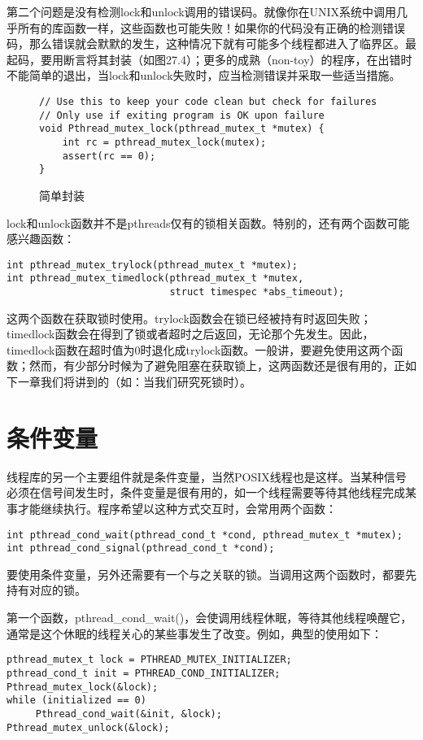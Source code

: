 第二个问题是没有检测lock和unlock调用的错误码。就像你在UNIX系统中调用几乎所有的库函数一样，这些函数也可能失败！如果你的代码没有正确的检测错误码，那么错误就会默默的发生，这种情况下就有可能多个线程都进入了临界区。最起码，要用断言将其封装（如图27.4）；更多的成熟（non-toy）的程序，在出错时不能简单的退出，当lock和unlock失败时，应当检测错误并采取一些适当措施。

\begin{figure}[h]
\begin{verbatim}
// Use this to keep your code clean but check for failures
// Only use if exiting program is OK upon failure
void Pthread_mutex_lock(pthread_mutex_t *mutex) {
    int rc = pthread_mutex_lock(mutex);
    assert(rc == 0);
}
\end{verbatim}
\setlength{\abovecaptionskip}{2pt}
\caption{简单封装}
\end{figure}

lock和unlock函数并不是pthreads仅有的锁相关函数。特别的，还有两个函数可能感兴趣函数：
\begin{verbatim}
int pthread_mutex_trylock(pthread_mutex_t *mutex);
int pthread_mutex_timedlock(pthread_mutex_t *mutex,
                            struct timespec *abs_timeout);
\end{verbatim}
这两个函数在获取锁时使用。trylock函数会在锁已经被持有时返回失败；timedlock函数会在得到了锁或者超时之后返回，无论那个先发生。因此，timedlock函数在超时值为0时退化成trylock函数。一般讲，要避免使用这两个函数；然而，有少部分时候为了避免阻塞在获取锁上，这两函数还是很有用的，正如下一章我们将讲到的（如：当我们研究死锁时）。

\section{条件变量}
线程库的另一个主要组件就是条件变量，当然POSIX线程也是这样。当某种信号必须在信号间发生时，条件变量是很有用的，如一个线程需要等待其他线程完成某事才能继续执行。程序希望以这种方式交互时，会常用两个函数：
\begin{verbatim}
int pthread_cond_wait(pthread_cond_t *cond, pthread_mutex_t *mutex);
int pthread_cond_signal(pthread_cond_t *cond);
\end{verbatim}

要使用条件变量，另外还需要有一个与之关联的锁。当调用这两个函数时，都要先持有对应的锁。

第一个函数，pthread\_cond\_wait()，会使调用线程休眠，等待其他线程唤醒它，通常是这个休眠的线程关心的某些事发生了改变。例如，典型的使用如下：
\begin{verbatim}
pthread_mutex_t lock = PTHREAD_MUTEX_INITIALIZER;
pthread_cond_t init = PTHREAD_COND_INITIALIZER;
Pthread_mutex_lock(&lock);
while (initialized == 0)
     Pthread_cond_wait(&init, &lock);
Pthread_mutex_unlock(&lock);
\end{verbatim}

